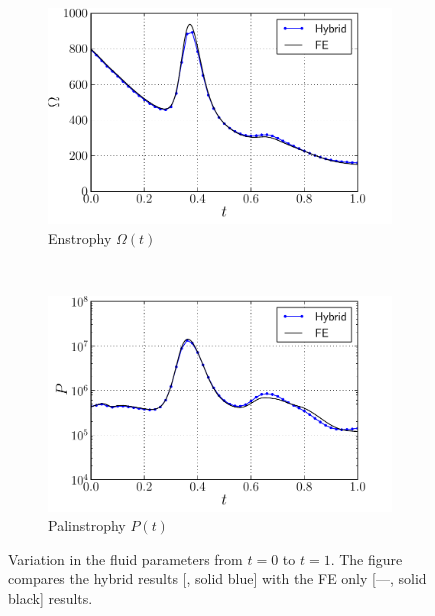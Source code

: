\begin{figure}[!p]
     \begin{subfigure}[b]{0.49\textwidth}
             \includegraphics[width=\textwidth]{./figures/hybrid/cbColl/hybrid_doubleMonopole_parameter_Omega.pdf}
             \caption{Enstrophy $\Omega(t)$}
             \label{fig:hybrid_dipole_Enstrophy_comparison}
	 \end{subfigure}
     ~
	 \begin{subfigure}[b]{0.48\textwidth}
	 		\includegraphics[width=\textwidth]{./figures/hybrid/cbColl/hybrid_doubleMonopole_parameter_P.pdf}
             \caption{Palinstrophy $P(t)$}
			\label{fig:hybrid_dipole_Palinstrophy_comparison}
	 \end{subfigure}     
     
     \caption{Variation in the fluid parameters from $t=0$ to $t=1$. The figure compares the hybrid results [{\color{plotBlue}{---}}, solid blue] with the FE only [---, solid black] results.} %
     \label{fig:hybrid_dipole_comparison}
	\end{figure}

